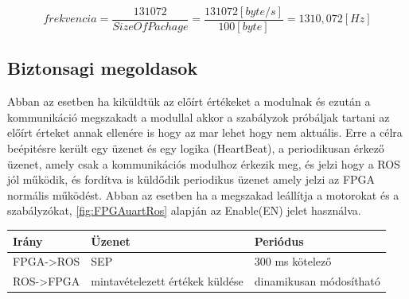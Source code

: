 \begin{equation}
    frekvencia = \frac{131072}{SizeOfPachage}=\frac{131072[byte/s]}{100[byte]}=1310,072 [Hz]
\end{equation}

\subsection{Biztonsagi megoldasok}

Abban az esetben ha kiküldtük az előírt értékeket a modulnak és ezután a kommunikáció megszakadt a modullal akkor a szabályzok próbáljak tartani az előírt érteket annak ellenére is hogy az mar lehet hogy nem aktuális. Erre a célra beépitésre került egy üzenet és egy logika (HeartBeat), a periodikusan érkező üzenet, amely csak a kommunikációs modulhoz érkezik meg, és jelzi hogy a ROS jól működik, és fordítva is küldődik periodikus üzenet amely jelzi az FPGA normális működést. Abban az esetben ha a  megszakad leállítja a motorokat és a szabályzókat,  \ref{fig:FPGAuartRos} alapján az Enable(EN) jelet használva.

\begin{table}[H]
\center
\begin{tabular}{lll}
\hline Irány   & Üzenet & Periódus    \\ \hline
FPGA->ROS &  SEP        & 300 ms kötelező         \\
ROS->FPGA &  mintavételezett értékek küldése & dinamikusan módosítható                   
\end{tabular}
\end{table}
